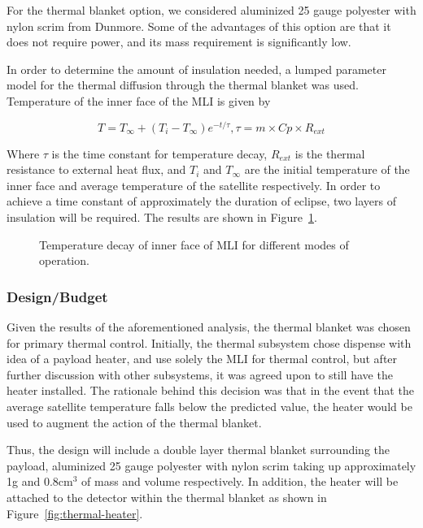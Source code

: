 \documentclass[12pt]{article}
\begin{document}
For the thermal blanket option, we considered aluminized 25 gauge polyester with nylon scrim from Dunmore. Some of the advantages of this option are that it does not require power, and its mass requirement is significantly low.

In order to determine the amount of insulation needed, a lumped parameter model for the thermal diffusion through the thermal blanket was used. Temperature of the inner face of the MLI is given by

\begin{equation}
T = T_\infty + (T_i- T_\infty)e^{-t/\tau}, \tau = m \times Cp \times R_{ext}
\label{eq:thermal-inner-MLI}
\end{equation}

Where $\tau$ is the time constant for temperature decay, $R_{ext}$ is the thermal resistance to external heat flux, and $T_i$ and $T_\infty$ are the initial temperature of the inner face and average temperature of the satellite respectively. In order to achieve a time constant of approximately the duration of eclipse, two layers of insulation will be required. The results are shown in Figure~\ref{fig:thermal-decay}.

\begin{figure}[ht]%
\centering
\caption{Temperature decay of inner face of MLI for different modes of operation.}%
\label{fig:thermal-decay}%
\end{figure}

\subsubsection{Design/Budget}

Given the results of the aforementioned analysis, the thermal blanket was chosen for primary thermal control. Initially, the thermal subsystem chose dispense with idea of a payload heater, and use solely the MLI for thermal control, but after further discussion with other subsystems, it was agreed upon to still have the heater installed. The rationale behind this decision was that in the event that the average satellite temperature falls below the predicted value, the heater would be used to augment the action of the thermal blanket.
 
Thus, the design will include a double layer thermal blanket surrounding the payload, aluminized 25 gauge polyester with nylon scrim taking up approximately 1g and 0.8cm$^3$ of mass and volume respectively. In addition, the heater will be attached to the detector within the thermal blanket as shown in Figure~\ref{fig:thermal-heater}.
\end{document}
